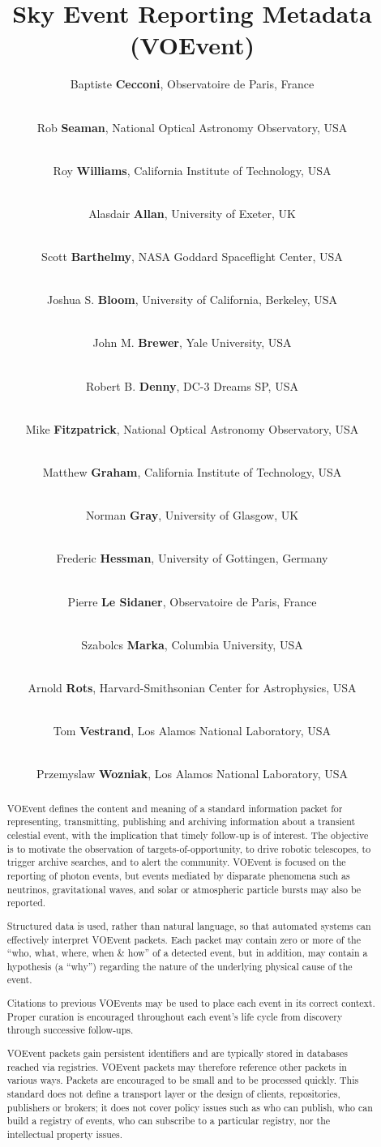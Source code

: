 \documentclass[11pt,a4paper]{ivoa}
\title{Sky Event Reporting Metadata (VOEvent)}
\author{Baptiste {\bf Cecconi}, Observatoire de Paris, France}
\author{\\Rob {\bf Seaman}, National Optical Astronomy Observatory, USA}
\author{\\Roy {\bf Williams}, California Institute of Technology, USA}
\author{\\Alasdair {\bf Allan}, University of Exeter, UK}
\author{\\Scott {\bf Barthelmy}, NASA Goddard Spaceflight Center, USA}
\author{\\Joshua S. {\bf Bloom}, University of California, Berkeley, USA}
\author{\\John M. {\bf Brewer}, Yale University, USA}
\author{\\Robert B. {\bf Denny}, DC-3 Dreams SP, USA}
\author{\\Mike {\bf Fitzpatrick}, National Optical Astronomy Observatory, USA}
\author{\\Matthew {\bf Graham}, California Institute of Technology, USA}
\author{\\Norman {\bf Gray}, University of Glasgow, UK}
\author{\\Frederic {\bf Hessman}, University of Gottingen, Germany}
\author{\\Pierre {\bf Le Sidaner}, Observatoire de Paris, France}
\author{\\Szabolcs {\bf Marka}, Columbia University, USA}
\author{\\Arnold {\bf Rots}, Harvard-Smithsonian Center for Astrophysics, USA}
\author{\\Tom {\bf Vestrand}, Los Alamos National Laboratory, USA}
\author{\\Przemyslaw {\bf Wozniak}, Los Alamos National Laboratory, USA}
\begin{document}
\begin{abstract}
VOEvent \citep{2011ivoa.spec.0711S} defines the content and meaning of a 
standard information packet for representing, transmitting, publishing and 
archiving information about a transient celestial event, with the implication 
that timely follow-up is of interest. The objective is to motivate the 
observation of targets-of-opportunity, to drive robotic telescopes, to trigger 
archive searches, and to alert the community. VOEvent is focused on the 
reporting of photon events, but events mediated by disparate phenomena such as 
neutrinos, gravitational waves, and solar or atmospheric particle bursts may 
also be reported.

Structured data is used, rather than natural language, so that automated systems
can effectively interpret VOEvent packets. Each packet may contain zero or more
of the ``who, what, where, when \& how'' of a detected event, but in addition,
may contain a hypothesis (a ``why'') regarding the nature of the underlying
physical cause of the event. 

Citations to previous VOEvents may be used to place each event in its correct
context. Proper curation is encouraged throughout each event's life cycle from
discovery through successive follow-ups. 

VOEvent packets gain persistent identifiers and are typically stored in
databases reached via registries. VOEvent packets may therefore reference other
packets in various ways. Packets are encouraged to be small and to be processed
quickly. This standard does not define a transport layer or the design of
clients, repositories, publishers or brokers; it does not cover policy issues
such as who can publish, who can build a registry of events, who can subscribe
to a particular registry, nor the intellectual property issues.
\end{abstract}


%
%
\end{document}
